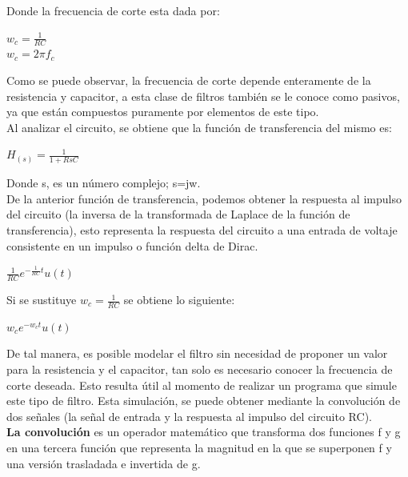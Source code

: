 Donde la frecuencia de corte esta dada por:
\begin{center}
	$ {w}_{c}=\frac{1}{RC}$ \\ $ {w}_{c}=2\pi {f}_{c}$
\end{center}
Como se puede observar, la frecuencia de corte depende enteramente de la resistencia y capacitor, a esta clase de filtros también se le conoce como pasivos, ya que están compuestos puramente por elementos de este tipo.\\ Al analizar el circuito, se obtiene que la función de transferencia del mismo es:
\begin{center}
	$ {H}_{\left(s \right)}=\frac{1}{1+RsC} $
\end{center}
Donde s, es un número complejo; s=jw.\\
De la anterior función de transferencia, podemos obtener la respuesta al impulso del circuito (la inversa de la transformada de Laplace de la función de transferencia), esto representa la respuesta del circuito a una entrada de voltaje consistente en un impulso o función delta de Dirac.
\begin{center}
	$ \frac{1}{RC}{e}^{-\frac{1}{RC}t}u \left(t\right) $
\end{center}
Si se sustituye ${w}_{c}=\frac{1}{RC}$ se obtiene lo siguiente:
\begin{center}
	$ {w}_{c}{e}^{-{w}_{c}t}u \left(t\right) $
\end{center}
De tal manera, es posible modelar el filtro sin necesidad de proponer un valor para la resistencia y el capacitor, tan solo es necesario conocer la frecuencia de corte deseada. Esto resulta útil al momento de realizar un programa que simule este tipo de filtro. Esta simulación, se puede obtener mediante la convolución de dos señales (la señal de entrada y la respuesta al impulso del circuito RC).\\ \textbf{La convolución} es un operador matemático que transforma dos funciones f y g en una tercera función que representa la magnitud en la que se superponen f y una versión trasladada e invertida de g. 
